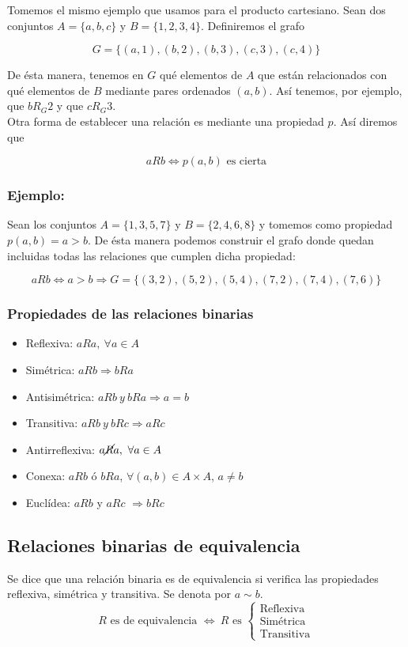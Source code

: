 \documentclass[0_algebra.tex]{subfiles}
\begin{document}
Tomemos el mismo ejemplo que usamos para el producto cartesiano. Sean dos conjuntos $A=\lbrace a,b,c \rbrace$ y $B=\lbrace 1,2,3,4 \rbrace$. Definiremos el grafo

$$
G=\lbrace (a,1),(b,2),(b,3),(c,3),(c,4) \rbrace
$$

De ésta manera, tenemos en $G$ qué elementos de $A$ que están relacionados con qué elementos de $B$ mediante pares ordenados $(a,b)$. Así tenemos, por ejemplo, que $bR_G2$ y que $cR_G3$.\\

Otra forma de establecer una relación es mediante una propiedad $p$. Así diremos que

$$
aRb \Leftrightarrow p(a,b) \text{ es cierta}
$$

\subsubsection*{Ejemplo:}

Sean los conjuntos $A=\lbrace 1,3,5,7 \rbrace$ y $B=\lbrace 2,4,6,8 \rbrace$ y tomemos como propiedad $p(a,b)=a>b$. De ésta manera podemos construir el grafo donde quedan incluidas todas las relaciones que cumplen dicha propiedad:

$$
aRb \Leftrightarrow a>b \Rightarrow G=\lbrace(3,2),(5,2),(5,4),(7,2),(7,4),(7,6) \rbrace
$$

\newpage
\subsubsection*{Propiedades de las relaciones binarias}
\begin{itemize}
\item Reflexiva: $aRa,\ \forall a \in A$
\item Simétrica: $aRb \Rightarrow bRa$
\item Antisimétrica: $aRb\ y\ bRa \Rightarrow a=b$
\item Transitiva: $aRb\ y\ bRc \Rightarrow aRc$
\item Antirreflexiva: $a\cancel{R} a,\ \forall a \in A$
\item Conexa: $aRb$ ó $bRa$, $\forall (a,b) \in A\times A$, $a\not = b$
\item Euclídea: $aRb$ y $aRc$ $\Rightarrow bRc$
\end{itemize}

\subsection*{Relaciones binarias de equivalencia}
Se dice que una relación binaria es de equivalencia si verifica las propiedades reflexiva, simétrica y transitiva. Se denota por $a \sim b$.
$$
R \text{ es de equivalencia } \Leftrightarrow \ R \text{ es }
\begin{cases}
\text{Reflexiva}\\
\text{Simétrica}\\
\text{Transitiva}
\end{cases}
$$
\end{document}

